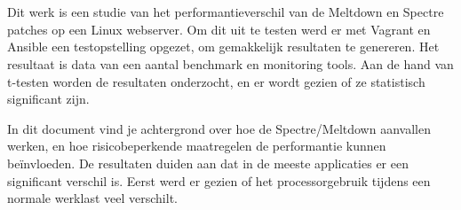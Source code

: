 
%
%

%



\chapter*{}

Dit werk is een studie van het performantieverschil van de Meltdown en Spectre patches op een Linux webserver.
Om dit uit te testen werd er met Vagrant en Ansible een testopstelling opgezet, om gemakkelijk resultaten te genereren.
Het resultaat is data van een aantal benchmark en monitoring tools.
Aan de hand van t-testen worden de resultaten onderzocht, en er wordt gezien of ze statistisch significant zijn.

In dit document vind je achtergrond over hoe de Spectre/Meltdown aanvallen werken, en hoe risicobeperkende maatregelen de performantie kunnen beïnvloeden.
De resultaten duiden aan dat in de meeste applicaties er een significant verschil is.
Eerst werd er gezien of het processorgebruik tijdens een normale werklast veel verschilt.

